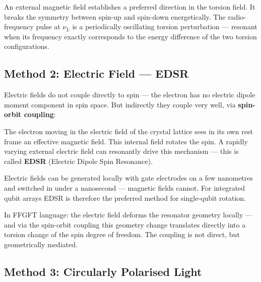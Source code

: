 \begin{keypoint}
An external magnetic field establishes a preferred direction
in the torsion field. It breaks the symmetry between
spin-up and spin-down energetically.
The radio-frequency pulse at $\nu_L$ is a periodically
oscillating torsion perturbation --- resonant when its
frequency exactly corresponds to the energy difference of the two
torsion configurations.
\end{keypoint}

\subsection{Method 2: Electric Field --- EDSR}
\label{sec:edsr}

Electric fields do not couple directly to spin ---
the electron has no electric dipole moment component
in spin space. But indirectly they couple very well,
via \textbf{spin-orbit coupling}:

The electron moving in the electric field of the crystal lattice
sees in its own rest frame an effective
magnetic field. This internal field rotates the spin.
A rapidly varying external electric field
can resonantly drive this mechanism ---
this is called \textbf{EDSR} (Electric Dipole Spin Resonance).

\begin{important}
Electric fields can be generated locally with gate electrodes
on a few nanometres and switched in under
a nanosecond --- magnetic fields cannot.
For integrated qubit arrays EDSR is therefore the
preferred method for single-qubit rotation.
\end{important}

In FFGFT language: the electric field deforms
the resonator geometry locally --- and via the
spin-orbit coupling this geometry change translates
directly into a torsion change of the spin degree of freedom.
The coupling is not direct, but geometrically mediated.

\subsection{Method 3: Circularly Polarised Light}
\label{sec:optical}

